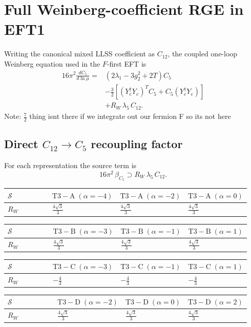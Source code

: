 \documentclass[9pt]{article}
\begin{document}
\section*{Full Weinberg-coefficient RGE in EFT1}
Writing the canonical mixed LLSS coefficient as $C_{12}$, the coupled one-loop Weinberg equation used in the $F$-first EFT is
\begin{align}
16\pi^2\frac{dC_5}{d\ln\mu}={}&(2\lambda_1-3g_2^2+2T)C_5\\
&-\frac32\left[(Y_e^\dagger Y_e)^T C_5+C_5(Y_e^\dagger Y_e)\right]\\
&+R_W\,\lambda_5\,C_{12}.
\end{align}
Note: $\frac{7}{2}$ thing isnt there if we integrate out our fermion F so its not here \subsection*{Direct $C_{12}\to C_5$ recoupling factor}
For each representation the source term is
\[16\pi^2\,\beta_{C_5}\supset R_W\,\lambda_5\,C_{12}.\]
\begin{longtable}{@{}p{0.37\linewidth}p{0.19\linewidth}p{0.19\linewidth}p{0.19\linewidth}@{}}
\toprule
$\mathcal{S}$ & $ \mathrm{T3-A}\;(\alpha=-4) $ & $ \mathrm{T3-A}\;(\alpha=-2) $ & $ \mathrm{T3-A}\;(\alpha=0) $ \\
\midrule
$R_W$ & $ \frac{4 \sqrt{3}}{3} $ & $ \frac{4 \sqrt{3}}{3} $ & $ \frac{4 \sqrt{3}}{3} $ \\
\bottomrule
\end{longtable}
\begin{longtable}{@{}p{0.37\linewidth}p{0.19\linewidth}p{0.19\linewidth}p{0.19\linewidth}@{}}
\toprule
$\mathcal{S}$ & $ \mathrm{T3-B}\;(\alpha=-3) $ & $ \mathrm{T3-B}\;(\alpha=-1) $ & $ \mathrm{T3-B}\;(\alpha=1) $ \\
\midrule
$R_W$ & $ \frac{4 \sqrt{3}}{3} $ & $ \frac{4 \sqrt{3}}{3} $ & $ \frac{4 \sqrt{3}}{3} $ \\
\bottomrule
\end{longtable}
\begin{longtable}{@{}p{0.37\linewidth}p{0.19\linewidth}p{0.19\linewidth}p{0.19\linewidth}@{}}
\toprule
$\mathcal{S}$ & $ \mathrm{T3-C}\;(\alpha=-3) $ & $ \mathrm{T3-C}\;(\alpha=-1) $ & $ \mathrm{T3-C}\;(\alpha=1) $ \\
\midrule
$R_W$ & $ - \frac{4}{3} $ & $ - \frac{4}{3} $ & $ - \frac{4}{3} $ \\
\bottomrule
\end{longtable}
\begin{longtable}{@{}p{0.37\linewidth}p{0.19\linewidth}p{0.19\linewidth}p{0.19\linewidth}@{}}
\toprule
$\mathcal{S}$ & $ \mathrm{T3-D}\;(\alpha=-2) $ & $ \mathrm{T3-D}\;(\alpha=0) $ & $ \mathrm{T3-D}\;(\alpha=2) $ \\
\midrule
$R_W$ & $ \frac{4 \sqrt{3}}{3} $ & $ \frac{4 \sqrt{3}}{3} $ & $ \frac{4 \sqrt{3}}{3} $ \\
\bottomrule
\end{longtable}
\end{document}
